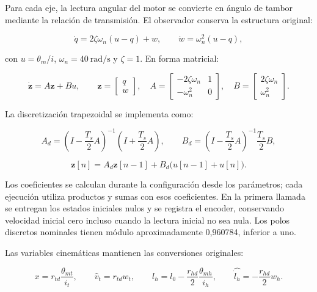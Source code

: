 \documentclass[a4paper,10pt,onecolumn,journal]{ieeeconf}
\numberwithin{equation}{section}
\begin{document}
Para cada eje, la lectura angular del motor se convierte en ángulo de tambor mediante la relación de transmisión. El observador conserva la estructura original:

\begin{equation}
\dot q=2\zeta\omega_n(u-q)+w,\qquad
\dot w=\omega_n^2(u-q),
\end{equation}

con $u=\theta_m/i$, $\omega_n=40\ \mathrm{rad/s}$ y $\zeta=1$. En forma matricial:

\begin{equation}
\dot{\boldsymbol z}=A\boldsymbol z+Bu,\qquad
\boldsymbol z=\begin{bmatrix}q\\w\end{bmatrix},\quad
A=\begin{bmatrix}-2\zeta\omega_n&1\\-\omega_n^2&0\end{bmatrix},\quad
B=\begin{bmatrix}2\zeta\omega_n\\\omega_n^2\end{bmatrix}.
\end{equation}

La discretización trapezoidal se implementa como:

\begin{equation}
A_d=\left(I-\frac{T_s}{2}A\right)^{-1}\left(I+\frac{T_s}{2}A\right),\qquad
B_d=\left(I-\frac{T_s}{2}A\right)^{-1}\frac{T_s}{2}B,
\end{equation}

\begin{equation}
\boldsymbol z[n]=A_d\boldsymbol z[n-1]+B_d\big(u[n-1]+u[n]\big).
\end{equation}

Los coeficientes se calculan durante la configuración desde los parámetros; cada ejecución utiliza productos y sumas con esos coeficientes. En la primera llamada se entregan los estados iniciales nulos y se registra el encoder, conservando velocidad inicial cero incluso cuando la lectura inicial no sea nula. Los polos discretos nominales tienen módulo aproximadamente 0,960784, inferior a uno.

Las variables cinemáticas mantienen las conversiones originales:

\begin{equation}
x=r_{td}\frac{\theta_{mt}}{i_t},\qquad
\widehat v_t=r_{td}w_t,\qquad
l_h=l_0-\frac{r_{hd}}{2}\frac{\theta_{mh}}{i_h},\qquad
\widehat{\dot l_h}=-\frac{r_{hd}}{2}w_h.
\end{equation}
\end{document}
